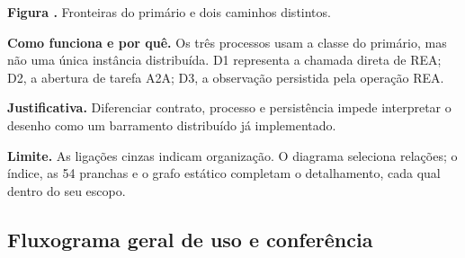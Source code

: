 \noindent\textbf{Figura \thefigure.} Fronteiras do primário e dois caminhos distintos.\par

\noindent\textbf{Como funciona e por quê.} Os três processos usam a classe do primário, mas não uma única instância distribuída. D1 representa a chamada direta de REA; D2, a abertura de tarefa A2A; D3, a observação persistida pela operação REA.\par

\noindent\textbf{Justificativa.} Diferenciar contrato, processo e persistência impede interpretar o desenho como um barramento distribuído já implementado.\par

\noindent\textbf{Limite.} As ligações cinzas indicam organização. O diagrama seleciona relações; o índice, as 54 pranchas e o grafo estático completam o detalhamento, cada qual dentro do seu escopo.\par



\clearpage{}\label{fig:global-flow}

\subsection*{Fluxograma geral de uso e conferência}

